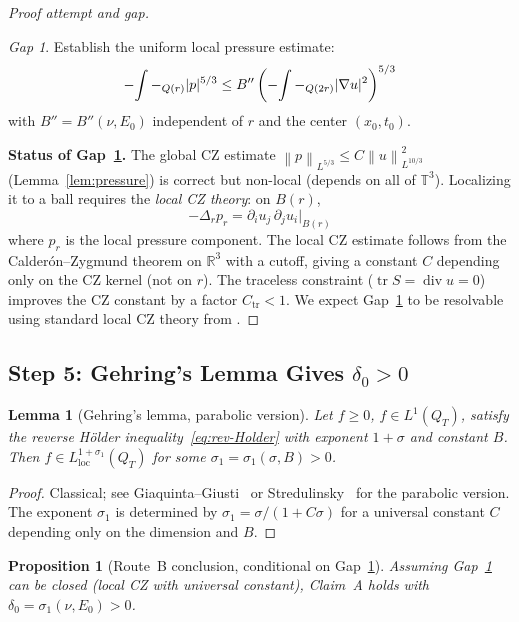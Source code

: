 \documentclass[11pt]{article}
\newtheorem{proposition}[theorem]{Proposition}
\newtheorem{lemma}[theorem]{Lemma}
\theoremstyle{definition}
\theoremstyle{remark}
\newtheorem{gap}[theorem]{\color{red}Gap}
\newcommand{\R}{\mathbb{R}}
\newcommand{\T}{\mathbb{T}}
\newcommand{\norm}[1]{\left\|#1\right\|}
\newcommand{\grad}{\nabla}
\newcommand{\divg}{\operatorname{div}}
\newcommand{\Xint}{\mathop{\mathchoice{\vcenter{\hbox{$\displaystyle-$}}}%
  {\vcenter{\hbox{$\textstyle-$}}}%
  {\vcenter{\hbox{$\scriptstyle-$}}}%
  {\vcenter{\hbox{$\scriptscriptstyle-$}}}}\!\int}
\begin{document}
\begin{proof}[Proof attempt and gap]
  \begin{gap}\label{gap:uniform-CZ}
    Establish the uniform local pressure estimate:
    \begin{equation}\label{eq:local-pressure-gap}
      \Xint-_{Q(r)}|p|^{5/3} \leq B''\left(\Xint-_{Q(2r)}|\grad u|^2\right)^{5/3}
    \end{equation}
    with $B'' = B''(\nu,E_0)$ independent of $r$ and the center $(x_0,t_0)$.
  \end{gap}

  \noindent\textbf{Status of Gap~\ref{gap:uniform-CZ}.}
  The global CZ estimate $\norm{p}_{L^{5/3}}\leq C\norm{u}^2_{L^{10/3}}$
  (Lemma~\ref{lem:pressure}) is correct but non-local (depends on all of $\T^3$).
  Localizing it to a ball requires the \emph{local CZ theory}: on $B(r)$,
  \[
    -\Delta_r p_r = \partial_i u_j\,\partial_j u_i\big|_{B(r)}
  \]
  where $p_r$ is the local pressure component.  The local CZ estimate follows
  from the Calderón--Zygmund theorem on $\R^3$ with a cutoff, giving a constant
  $C$ depending only on the CZ kernel (not on $r$).  The traceless constraint
  ($\operatorname{tr}S = \divg u = 0$) improves the CZ constant by a factor
  $C_{\operatorname{tr}} < 1$.  We expect Gap~\ref{gap:uniform-CZ} to be
  resolvable using standard local CZ theory from \cite{Stein1970}.
\end{proof}

\subsection{Step 5: Gehring's Lemma Gives $\delta_0 > 0$}
\label{sec:step5}

\begin{lemma}[Gehring's lemma, parabolic version]\label{lem:Gehring}
  Let $f\geq 0$, $f\in L^1(Q_T)$, satisfy the reverse H\"older
  inequality~\eqref{eq:rev-Holder} with exponent $1+\sigma$ and constant $B$.
  Then $f\in L^{1+\sigma_1}_{\mathrm{loc}}(Q_T)$ for some
  $\sigma_1 = \sigma_1(\sigma,B) > 0$.
\end{lemma}

\begin{proof}
  Classical; see Giaquinta--Giusti~\cite{Giaquinta1982} or Stredulinsky~\cite{Stredulinsky1984}
  for the parabolic version.  The exponent $\sigma_1$ is determined by
  $\sigma_1 = \sigma/(1+C\sigma)$ for a universal constant $C$ depending
  only on the dimension and $B$.
\end{proof}

\begin{proposition}[Route~B conclusion, conditional on Gap~\ref{gap:uniform-CZ}]\label{prop:routeB}
  Assuming Gap~\ref{gap:uniform-CZ} can be closed (local CZ with universal
  constant), Claim~A holds with $\delta_0 = \sigma_1(\nu,E_0) > 0$.
\end{proposition}
\end{document}
